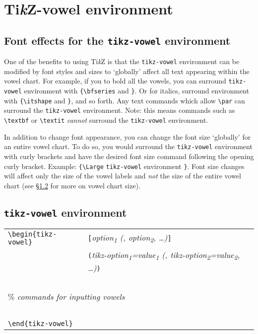 \documentclass{article}
\newcommand{\pkg}[1]{\texttt{#1}}
\newcommand{\TikZ}{Ti\textit{k}Z\xspace}
\begin{document}
\section{\TikZ-vowel environment}
\label{sec:TikZ-vowel environment}

\subsection{Font effects for the \texttt{tikz-vowel} environment}
\label{sec:Font effects for the tikz-vowel environment}

One of the benefits to using \TikZ is that the \verb|tikz-vowel| environment can be modified by font styles and sizes to `globally' affect all text appearing within the vowel chart.  For example, if you to bold all the vowels, you can surround \verb|tikz-vowel| environment with \verb|{\bfseries| and \verb|}|.  Or for italics, surround \verb|| environment with \verb|{\itshape| and \verb|}|, and so forth.  Any text commands which allow \verb|\par| can surround the \verb|tikz-vowel| environment.  {\color{red}Note: this means commands such as \verb|\textbf| or \verb|\textit| {\large\textit{cannot}} surround the \verb|tikz-vowel| environment.}

In addition to change font appearance, you can change the font size `globally' for an entire vowel chart.  To do so, you would surround the \verb|tikz-vowel| environment with curly brackets and have the desired font size command following the opening curly bracket.  Example: \verb|{\Large| \verb|tikz-vowel| environment \verb|}|.  Font size changes will affect only the size of the vowel labels and \textit{not} the size of the entire vowel chart (see \S \ref{sec:tikz-vowel environment} for more on vowel chart size). 


\subsection{\pkg{tikz-vowel} environment}
\label{sec:tikz-vowel environment}

\medskip

\begin{center}
\begin{tabular}{ll}
\verb|\begin{tikz-vowel}| & \verb|[|\textit{option\textsubscript{1} (, option\textsubscript{2}, \dots)}\verb|]| \\
~ & \verb|(|\textit{tikz-option\textsubscript{1}=value\textsubscript{1} (, tikz-option\textsubscript{2}=value\textsubscript{2}, \dots)}\verb|)| \\
~ & ~ \\
\multicolumn{2}{l}{\qquad \% \textit{commands for inputting vowels}} \\
~ & ~ \\
\verb|\end{tikz-vowel}| & 
\end{tabular}
\end{center}
\end{document}
